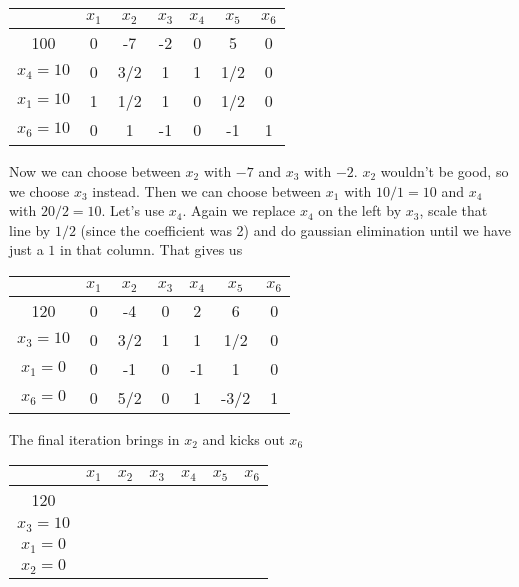 \begin{Ex}
\begin{center}
\begin{tabular}{c|cccccc}
  & $x_1$ & $x_2$ & $x_3$ & $x_4$ & $x_5$ & $x_6$ \\\hline
100 & 0 & -7 & -2 & 0 & 5 & 0\\\hline
$x_4=10$ & 0 & 3/2 & 1 & 1 & 1/2 & 0 \\
$x_1=10$ & 1 & 1/2 & 1 & 0 &  1/2 & 0\\
$x_6=10$ & 0 & 1 & -1 & 0 & -1 &  1\\
\end{tabular}
\end{center}

Now we can choose between $x_2$ with $-7$ and $x_3$ with $-2$. $x_2$ wouldn't be good, %
so we choose $x_3$ instead. Then we can choose between $x_1$ with $10/1=10$ and $x_4$ with $20/2=10$. Let's use $x_4$. Again we replace $x_4$ on the left by $x_3$, scale that line by $1/2$ (since the coefficient was 2) and do gaussian elimination until we have just a $1$ in that column. That gives us


\begin{center}
\begin{tabular}{c|cccccc}
  & $x_1$ & $x_2$ & $x_3$ & $x_4$ & $x_5$ & $x_6$ \\\hline
120 & 0 & -4 & 0 & 2 & 6 & 0\\\hline
$x_3=10$ & 0 & 3/2 & 1 & 1 & 1/2 & 0 \\
$x_1=0$ &0  & -1 & 0 & -1 &  1 & 0\\
$x_6=0$ & 0 & 5/2 & 0 & 1 & -3/2 &  1\\
\end{tabular}
\end{center}

The final iteration brings in $x_2$ and kicks out $x_6$

\begin{center}
\begin{tabular}{c|cccccc}
         & $x_1$ & $x_2$ & $x_3$ & $x_4$ & $x_5$ & $x_6$ \\\hline
120      &\\\hline
$x_3=10$ &\\
$x_1=0$  &\\
$x_2=0$  &\\
\end{tabular}
\end{center}
\end{Ex}



